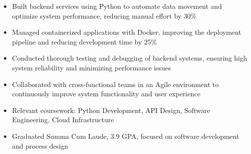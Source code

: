 \par\smallskip
\begin{minipage}{13.75cm}
  \begin{minipage}{6.5cm}
    \begin{itemize}
      \item Built backend services using Python to automate data movement and optimize system performance, reducing manual effort by 30\%
      \item Managed containerized applications with Docker, improving the deployment pipeline and reducing development time by 25\%
    \end{itemize}
  \end{minipage}
  \hfill
  \begin{minipage}{6.5cm}
    \begin{itemize}
      \item Conducted thorough testing and debugging of backend systems, ensuring high system reliability and minimizing performance issues
      \item Collaborated with cross-functional teams in an Agile environment to continuously improve system functionality and user experience
    \end{itemize}
  \end{minipage}
\end{minipage}

\par\bigskip
{}
\begin{itemize}
  \item Relevant coursework: Python Development, API Design, Software Engineering, Cloud Infrastructure
\end{itemize}
\divider

\begin{itemize}
  \item Graduated Summa Cum Laude, 3.9 GPA, focused on software development and process design
\end{itemize}

